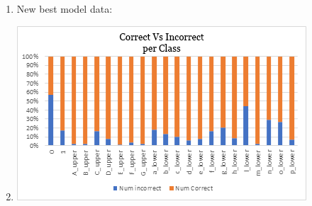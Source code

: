 \documentclass[12pt]{article} %
\begin{document}
\begin{enumerate}[label = (\roman*)]
\item New best model data:
\item \includegraphics{charts/chart-class-rates}

\end{enumerate}
\end{document}
